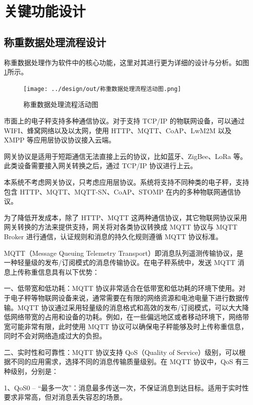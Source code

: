 \section{关键功能设计}\label{sec:keyFunction}

\subsection{称重数据处理流程设计}

称重数据处理作为软件中的核心功能，这里对其进行更为详细的设计与分析。如图\ref{fig:称重数据处理流程活动图}所示。

\begin{figure}[H]
    \centering
    \texttt{[image: ../design/out/称重数据处理流程活动图.png]}
    \caption{称重数据处理流程活动图}
    \label{fig:称重数据处理流程活动图}
\end{figure}

市面上的电子秤支持多种通信协议。对于支持 TCP/IP 的物联网设备，可以通过 WIFI、蜂窝网络以及以太网，使用 HTTP、MQTT、CoAP、LwM2M 以及 XMPP 等应用层协议协议接入云端。

网关协议是适用于短距通信无法直接上云的协议，比如蓝牙、ZigBee、LoRa 等。此类设备需要接入网关转换之后，通过 TCP/IP 协议进行上云。

本系统不考虑网关协议，只考虑应用层协议。系统将支持不同种类的电子秤，支持包含 HTTP、MQTT、MQTT-SN、CoAP、STOMP 在内的多种物联网通信协议。

为了降低开发成本，除了 HTTP、MQTT 这两种通信协议，其它物联网协议采用网关转换的方法来提供支持，网关将对各类协议转换成 MQTT 协议与 MQTT Broker 进行通信，认证规则和消息的持久化规则遵循 MQTT 协议标准。

MQTT（Message Queuing Telemetry Transport）即消息队列遥测传输协议，是一种轻量级的发布/订阅模式的消息传输协议。在电子秤系统中，发送 MQTT 消息上传称重信息具有以下优势：

一、低带宽和低功耗：MQTT 协议非常适合在低带宽和低功耗的环境下使用。对于电子秤等物联网设备来说，通常需要在有限的网络资源和电池电量下进行数据传输。MQTT 协议通过采用轻量级的消息格式和高效的发布/订阅模式，可以大大降低网络带宽的占用和设备的功耗。例如，在一些偏远地区或者移动环境下，网络带宽可能非常有限，此时使用 MQTT 协议可以确保电子秤能够及时上传称重信息，同时不会对网络造成过大的负担\cite{Jia2015}。

二、实时性和可靠性：MQTT 协议支持 QoS（Quality of Service）级别，可以根据不同的应用需求，选择不同的消息传输质量级别。在 MQTT 协议中，QoS 有三种级别\cite{Jia2015}，分别是：

1、QoS0 – “最多一次”：消息最多传送一次，不保证消息到达目标。适用于实时性要求非常高，但对消息丢失容忍的场景。

